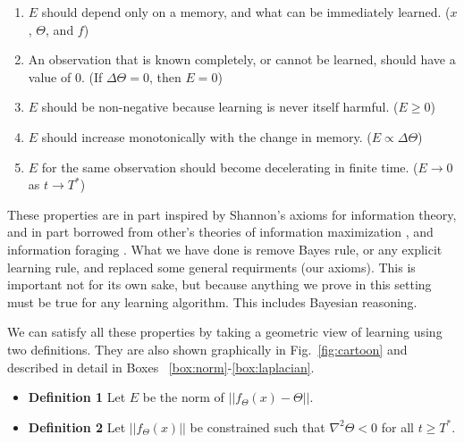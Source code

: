 \begin{enumerate}
	\item $E$ should depend only on a memory, and what can be immediately learned. ($x$, $\Theta$, and $f$)
	\item An observation that is known completely, or cannot be learned, should have a value of 0. (If $\Delta \Theta = 0$, then $E=0$)
	\item $E$ should be non-negative because learning is never itself harmful. ($E \ge 0$)
	\item $E$ should increase monotonically with the change in memory. ($E \propto \Delta \Theta$)
	\item $E$ for the same observation should become decelerating in finite time. ($E \rightarrow 0$ as $t \rightarrow T^*$)
\end{enumerate}

These properties are in part inspired by Shannon's axioms for information theory, and in part borrowed from other's theories of information maximization \cite{Itti2009,Jaegle2019,Schmidhuber1991}, and information foraging \citep{Inglis2001,Reddy2016,Pirolli2007}. What we have done is remove Bayes rule, or any explicit learning rule, and replaced some general requirments (our axioms). This is important not for its own sake, but because anything we prove in this  setting must be true for any learning algorithm. This includes Bayesian reasoning. 

We can satisfy all these properties by taking a geometric view of learning using two definitions. They are also shown graphically in Fig.~\ref{fig:cartoon} and described in detail in Boxes ~\ref{box:norm}-\ref{box:laplacian}.

\begin{itemize}
	\item[] \textbf{Definition 1} Let $E$ be the norm of $|| f_{\Theta}(x) - \Theta ||$.	
	\item[] \textbf{Definition 2} Let $|| f_{\Theta}(x)||$ be constrained such that $\nabla^2 \Theta < 0$ for all $ t \ge T^*$. 	
\end{itemize}

